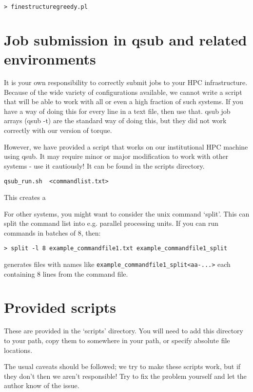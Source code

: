 \documentclass[11pt]{article}
\begin{document}
\begin{lstlisting}[caption=finestructuregreedy]
> finestructuregreedy.pl
\end{lstlisting}


\section{Job submission in qsub and related environments}
It is your own responsibility to correctly submit jobs to your HPC infrastructure. Because of the wide variety of configurations available, we cannot write a script that will be able to work with all or even a high fraction of such systems. If you have a way of doing this for every line in a text file, then use that. qsub job arrays (qsub -t) are the standard way of doing this, but they did not work correctly with our version of torque.

However, we have provided a script that works on our institutional HPC machine using qsub. It may require minor or major modification to work with other systems - use it cautiously! It can be found in the scripts directory.
\begin{lstlisting}[caption=qsub script for job submission]
qsub_run.sh  <commandlist.txt>
\end{lstlisting}
This creates a 

For other systems, you might want to consider the unix command `split'. This can split the command list into e.g. parallel processing units. If you can run commands in batches of 8, then:
\begin{lstlisting}[caption=Qsub script for job submission]
> split -l 8 example_commandfile1.txt example_commandfile1_split
\end{lstlisting}
generates files with names like \verb!example_commandfile1_split<aa-...>! each containing 8 lines from the command file.

\section{Provided scripts}
\label{sec:scripts}
These are provided in the `scripts' directory. You will need to add this directory to your path, copy them to somewhere in your path, or specify absolute file locations.

The usual caveats should be followed; we try to make these scripts work, but if they don't then we aren't responsible! Try to fix the problem yourself and let the author know of the issue.
\end{document}
